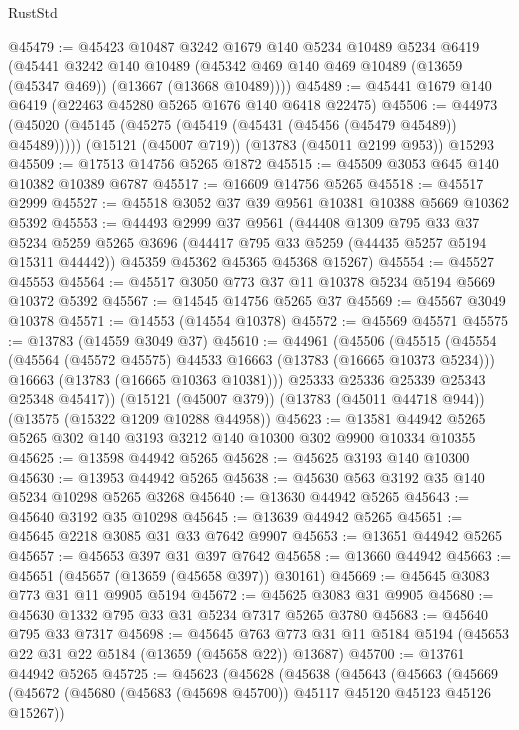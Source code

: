 \begin{lexlean}{RustStd}
\begin{coremodule}
@45479 := @45423
    @10487
    @3242
    @1679
    @140
    @5234
    @10489
    @5234
    @6419
    (@45441
      @3242
      @140
      @10489
      (@45342 @469 @140 @469 @10489 (@13659 (@45347 @469)) (@13667 (@13668 @10489))))
@45489 := @45441 @1679 @140 @6419 (@22463 @45280 @5265 @1676 @140 @6418 @22475)
@45506 := @44973
    (@45020 (@45145 (@45275 (@45419 (@45431 (@45456 (@45479 @45489)) @45489)))))
    (@15121 (@45007 @719))
    (@13783 (@45011 @2199 @953))
    @15293
@45509 := @17513 @14756 @5265 @1872
@45515 := @45509 @3053 @645 @140 @10382 @10389 @6787
@45517 := @16609 @14756 @5265
@45518 := @45517 @2999
@45527 := @45518 @3052 @37 @39 @9561 @10381 @10388 @5669 @10362 @5392
@45553 := @44493
    @2999
    @37
    @9561
    (@44408
      @1309
      @795
      @33
      @37
      @5234
      @5259
      @5265
      @3696
      (@44417 @795 @33 @5259 (@44435 @5257 @5194 @15311 @44442))
      @45359
      @45362
      @45365
      @45368
      @15267)
@45554 := @45527 @45553
@45564 := @45517 @3050 @773 @37 @11 @10378 @5234 @5194 @5669 @10372 @5392
@45567 := @14545 @14756 @5265 @37
@45569 := @45567 @3049 @10378
@45571 := @14553 (@14554 @10378)
@45572 := @45569 @45571
@45575 := @13783 (@14559 @3049 @37)
@45610 := @44961
    (@45506
      (@45515
        (@45554
          (@45564 (@45572 @45575) @44533 @16663 (@13783 (@16665 @10373 @5234)))
          @16663
          (@13783 (@16665 @10363 @10381)))
        @25333
        @25336
        @25339
        @25343
        @25348
        @45417))
    (@15121 (@45007 @379))
    (@13783 (@45011 @44718 @944))
    (@13575 (@15322 @1209 @10288 @44958))
@45623 := @13581 @44942 @5265 @5265 @302 @140 @3193 @3212 @140 @10300 @302 @9900 @10334 @10355
@45625 := @13598 @44942 @5265
@45628 := @45625 @3193 @140 @10300
@45630 := @13953 @44942 @5265
@45638 := @45630 @563 @3192 @35 @140 @5234 @10298 @5265 @3268
@45640 := @13630 @44942 @5265
@45643 := @45640 @3192 @35 @10298
@45645 := @13639 @44942 @5265
@45651 := @45645 @2218 @3085 @31 @33 @7642 @9907
@45653 := @13651 @44942 @5265
@45657 := @45653 @397 @31 @397 @7642
@45658 := @13660 @44942
@45663 := @45651 (@45657 (@13659 (@45658 @397)) @30161)
@45669 := @45645 @3083 @773 @31 @11 @9905 @5194
@45672 := @45625 @3083 @31 @9905
@45680 := @45630 @1332 @795 @33 @31 @5234 @7317 @5265 @3780
@45683 := @45640 @795 @33 @7317
@45698 := @45645
    @763
    @773
    @31
    @11
    @5184
    @5194
    (@45653 @22 @31 @22 @5184 (@13659 (@45658 @22)) @13687)
@45700 := @13761 @44942 @5265
@45725 := @45623
    (@45628
      (@45638
        (@45643
          (@45663
            (@45669
              (@45672 (@45680 (@45683 (@45698 @45700)) @45117 @45120 @45123 @45126 @15267))

\end{coremodule}
\end{lexlean}
